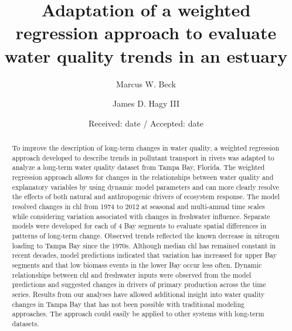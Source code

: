 \documentclass{svjour3}\usepackage[]{graphicx}\usepackage[]{color}
\begin{document}
\title{Adaptation of a weighted regression approach to evaluate water quality trends in an estuary
}


\author{Marcus W. Beck       \and
        James D. Hagy III
}


\date{Received: date / Accepted: date}

\maketitle

\begin{abstract}
To improve the description of long-term changes in water quality, a weighted regression approach developed to describe trends in pollutant transport in rivers was adapted to analyze a long-term water quality dataset from Tampa Bay, Florida.  The weighted regression approach allows for changes in the relationships between water quality and explanatory variables by using dynamic model parameters and can more clearly resolve the effects of both natural and anthropogenic drivers of ecosystem response.  The model resolved changes in \ac{chl} from 1974 to 2012 at seasonal and multi-annual time scales while considering variation associated with changes in freshwater influence.  Separate models were developed for each of 4 Bay segments to evaluate spatial differences in patterns of long-term change.  Observed trends reflected the known decrease in nitrogen loading to Tampa Bay since the 1970s. Although median \ac{chl} has remained constant in recent decades, model predictions indicated that variation has increased for upper Bay segments and that low biomass events in the lower Bay occur less often. Dynamic relationships between \ac{chl} and freshwater inputs were observed from the model predictions and suggested changes in drivers of primary production across the time series.  Results from our analyses have allowed additional insight into water quality changes in Tampa Bay that has not been possible with traditional modeling approaches. The approach could easily be applied to other systems with long-term datasets.
\end{abstract}
\end{document}
